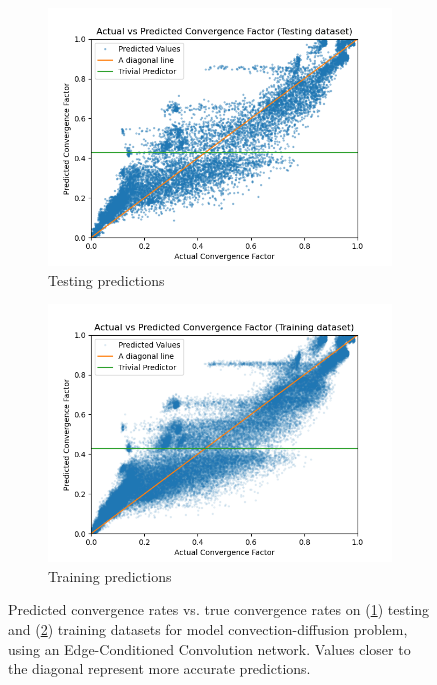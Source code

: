 \documentclass[review]{siamart190516}
\begin{document}
\begin{figure}[h]
  \centering
  \begin{subfigure}{.48\textwidth}
    \includegraphics[width=\textwidth]{figs/cd_var_conv_mpnn_test_pred.png}
    \caption{Testing predictions}
    \label{subfig:cd_mpnn_test}
  \end{subfigure}
  \begin{subfigure}{.48\textwidth}
    \includegraphics[width=\textwidth]{figs/cd_var_conv_mpnn_train_pred.png}
    \caption{Training predictions}
    \label{subfig:cd_mpnn_train}
  \end{subfigure}
  \caption{Predicted convergence rates vs. true convergence rates on (\ref{subfig:cd_mpnn_test}) testing and (\ref{subfig:cd_mpnn_train}) training datasets for model convection-diffusion problem, using an Edge-Conditioned Convolution network. Values closer to the diagonal represent more accurate predictions.}
  \label{fig:cd_mpnn_pred}
\end{figure}
\end{document}

